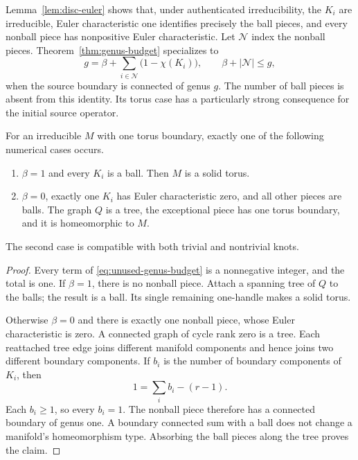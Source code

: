 Lemma~\ref{lem:disc-euler} shows that, under authenticated irreducibility,
the $K_i$ are irreducible, Euler characteristic one identifies precisely
the ball pieces, and every nonball piece has nonpositive Euler
characteristic.  Let $\mathcal N$ index the nonball pieces.
Theorem~\ref{thm:genus-budget} specializes to
\begin{equation}
 g=\beta+\sum_{i\in\mathcal N}\bigl(1-\chi(K_i)\bigr),
 \qquad \beta+|\mathcal N|\leq g,
 \label{eq:unused-genus-budget}
\end{equation}
when the source boundary is connected of genus $g$.
The number of ball pieces is absent from this identity.  Its torus case
has a particularly strong consequence for the initial source operator.

\begin{corollary}
\label{cor:unused-torus}
For an irreducible $M$ with one torus boundary, exactly one of the following
numerical cases occurs.
\begin{enumerate}
 \item $\beta=1$ and every $K_i$ is a ball.  Then $M$ is a solid torus.
 \item $\beta=0$, exactly one $K_i$ has Euler characteristic zero, and all
 other pieces are balls.  The graph $Q$ is a tree, the exceptional piece
 has one torus boundary, and it is homeomorphic to $M$.
\end{enumerate}
The second case is compatible with both trivial and nontrivial knots.
\end{corollary}

\begin{proof}
Every term of \eqref{eq:unused-genus-budget} is a nonnegative integer,
and the total is one.  If $\beta=1$, there is no nonball piece.  Attach a
spanning tree of $Q$ to the balls; the result is a ball.  Its single remaining
one-handle makes a solid torus.

Otherwise $\beta=0$ and there is exactly one nonball piece, whose Euler
characteristic is zero.  A connected graph of cycle rank zero is a tree.
Each reattached tree edge joins different manifold components and hence
joins two different boundary components.  If $b_i$ is the number of boundary
components of $K_i$, then
\[
 1=\sum_i b_i-(r-1).
\]
Each $b_i\geq1$, so every $b_i=1$.  The nonball piece therefore has a
connected boundary of genus one.  A boundary connected sum with a ball
does not change a manifold's homeomorphism type.  Absorbing the ball pieces
along the tree proves the claim.
\end{proof}

